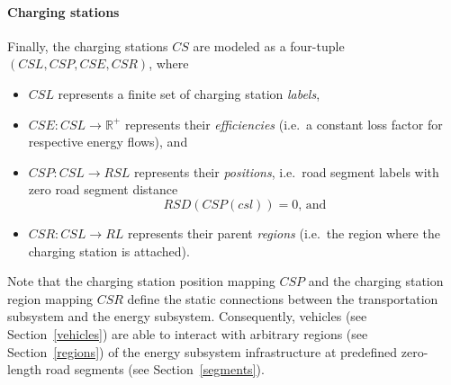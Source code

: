 \paragraph{Charging stations}
\label{charging_stations}

Finally, the charging stations $CS$ are modeled as a four-tuple $(CSL, CSP, CSE, CSR)$, where
\begin{itemize}
	\item $CSL$ represents a finite set of charging station \textit{labels},
	\item $CSE: CSL \rightarrow \mathbb{R}^+$ represents their \textit{efficiencies} (i.e.\ a constant loss factor for respective energy flows), and
	\item $CSP: CSL \rightarrow RSL$ represents their \textit{positions}, i.e.\ road segment labels with zero road segment distance
	\[
		RSD(CSP(csl)) = 0 \textrm{, and}
	\]
	\item $CSR: CSL \rightarrow RL$ represents their parent \textit{regions} (i.e.\ the region where the charging station is attached).
\end{itemize}
Note that the charging station position mapping $CSP$  and the charging station region mapping $CSR$ define the static connections between the transportation subsystem and the energy subsystem. Consequently, vehicles (see Section~\ref{vehicles}) are able to interact with arbitrary regions (see Section~\ref{regions}) of the energy subsystem infrastructure at predefined zero-length road segments (see Section~\ref{segments}).

